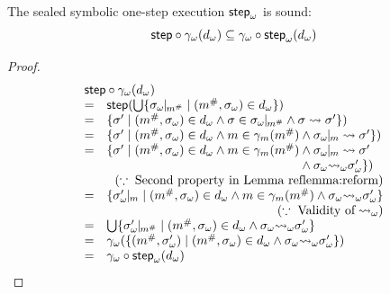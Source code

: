 \begin{lemma}\label{lemma:sound-symbstep}
  The sealed symbolic one-step execution ${\textsf{step}}_\omega$ is sound:
  \[
    \textsf{step} \circ {\gamma}_\omega({{d}_\omega}) \subseteq
    {\gamma}_\omega \circ {\textsf{step}}_\omega({{d}_\omega})\\
  \]
\end{lemma}
\begin{proof}
  \[
    \begin{array}{cl}
      \multicolumn{2}{l}{\step \circ \symbgamma(\symbelem)}\\
      =& \step(\bigcup \{ \instant{\symbst}{\absimap} \mid (\absimap, \symbst) \in
      \symbelem\})\\
      =& \{ \st' \mid (\absimap, \symbst) \in \symbelem \wedge \st \in
      \instant{\symbst}{\absimap} \wedge \st \trans \st'\})\\
      =& \{ \st' \mid (\absimap, \symbst) \in \symbelem \wedge \imap \in
      \imapgamma(\absimap) \wedge \instant{\symbst}{\imap} \trans \st'\})\\
      =& \{ \st' \mid (\absimap, \symbst) \in \symbelem \wedge \imap \in
      \imapgamma(\absimap) \wedge \instant{\symbst}{\imap} \trans \st'\\
       & \phantom{\{ \st' \mid (\absimap, \symbst) \in \symbelem \wedge \imap \in
      \imapgamma(\absimap)} \wedge \symbst \symbtrans \symbst' \})\\
       & \multicolumn{1}{r}{(\because \; \text{Second property in
       Lemma~ref{lemma:reform}})}\\
      =& \{ \instant{\symbst'}{\imap} \mid (\absimap, \symbst)
      \in \symbelem \wedge \imap \in \imapgamma(\absimap) \wedge \symbst
      \symbtrans \symbst'\}\\
      & \multicolumn{1}{r}{(\because \; \text{Validity of} \; \symbtrans)}\\
      =& \bigcup \{ \instant{\symbst'}{\absimap} \mid (\absimap, \symbst)
      \in \symbelem \wedge \symbst \symbtrans \symbst' \}\\
      =& \symbgamma(\{ (\absimap, \symbst') \mid (\absimap, \symbst)
      \in \symbelem \wedge \symbst \symbtrans \symbst' \})\\
      =& \symbgamma \circ \symbstep(\symbelem)\\
    \end{array}
  \]
\end{proof}


